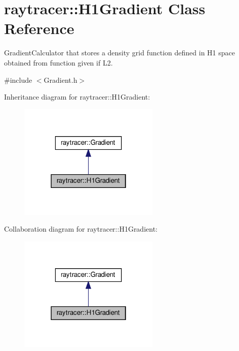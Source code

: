 \hypertarget{classraytracer_1_1H1Gradient}{}\section{raytracer\+:\+:H1\+Gradient Class Reference}
\label{classraytracer_1_1H1Gradient}


Gradient\+Calculator that stores a density grid function defined in H1 space obtained from function given if L2.  




{\ttfamily \#include $<$Gradient.\+h$>$}



Inheritance diagram for raytracer\+:\+:H1\+Gradient\+:
\nopagebreak
\begin{figure}[H]
\begin{center}
\leavevmode
\includegraphics[width=190pt]{classraytracer_1_1H1Gradient__inherit__graph}
\end{center}
\end{figure}


Collaboration diagram for raytracer\+:\+:H1\+Gradient\+:
\nopagebreak
\begin{figure}[H]
\begin{center}
\leavevmode
\includegraphics[width=190pt]{classraytracer_1_1H1Gradient__coll__graph}
\end{center}
\end{figure}

